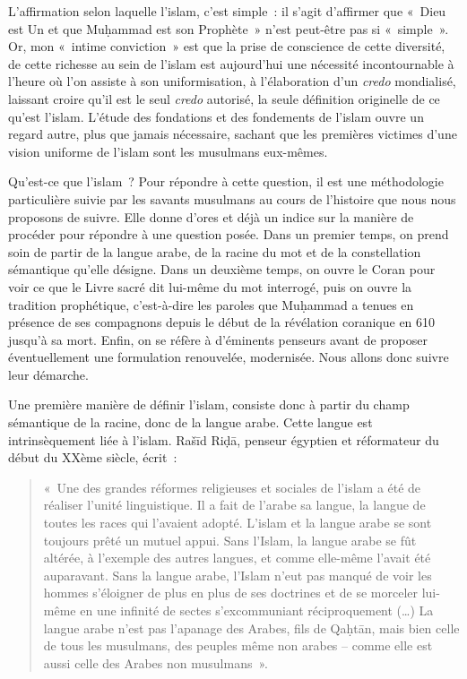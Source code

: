L'affirmation selon laquelle l'islam, c'est simple~: il s'agit
d'affirmer que «~Dieu est Un et que Muḥammad est son Prophète~» n'est
peut-être pas si «~simple~». Or, mon «~intime conviction~» est que la
prise de conscience de cette diversité, de cette richesse au sein de
l'islam est aujourd'hui une nécessité incontournable à l'heure où l'on
assiste à son uniformisation, à l'élaboration d'un \emph{credo}
mondialisé, laissant croire qu'il est le seul \emph{credo} autorisé, la
seule définition originelle de ce qu'est l'islam. L'étude des fondations
et des fondements de l'islam ouvre un regard autre, plus que jamais
nécessaire, sachant que les premières victimes d'une vision uniforme de
l'islam sont les musulmans eux-mêmes.


Qu'est-ce que l'islam~? Pour répondre à cette question, il est une
méthodologie particulière suivie par les savants musulmans au cours de
l'histoire que nous nous proposons de suivre. Elle donne d'ores et déjà
un indice sur la manière de procéder pour répondre à une question posée.
Dans un premier temps, on prend soin de partir de la langue arabe, de la
racine du mot et de la constellation sémantique qu'elle désigne. Dans un
deuxième temps, on ouvre le Coran pour voir ce que le Livre sacré dit
lui-même du mot interrogé, puis on ouvre la tradition prophétique,
c'est-à-dire les paroles que Muḥammad a tenues en présence de ses
compagnons depuis le début de la révélation coranique en 610 jusqu'à sa
mort. Enfin, on se réfère à d'éminents penseurs avant de proposer
éventuellement une formulation renouvelée, modernisée. Nous allons donc
suivre leur démarche.

Une première manière de définir l'islam, consiste donc à partir du champ
sémantique de la racine, donc de la langue arabe. Cette langue est
intrinsèquement liée à l'islam. Rašīd Riḍā, penseur égyptien et
réformateur du début du XXème siècle, écrit~:

\begin{quote}
«~Une des grandes réformes religieuses et sociales de l'islam a été de
réaliser l'unité linguistique. Il a fait de l'arabe sa langue, la langue
de toutes les races qui l'avaient adopté. L'islam et la langue arabe se
sont toujours prêté un mutuel appui. Sans l'Islam, la langue arabe se
fût altérée, à l'exemple des autres langues, et comme elle-même l'avait
été auparavant. Sans la langue arabe, l'Islam n'eut pas manqué de voir
les hommes s'éloigner de plus en plus de ses doctrines et de se morceler
lui-même en une infinité de sectes s'excommuniant réciproquement
(\ldots) La langue arabe n'est pas l'apanage des Arabes, fils de Qaḥtān,
mais bien celle de tous les musulmans, des peuples même non arabes --
comme elle est aussi celle des Arabes non musulmans~».
\end{quote}

